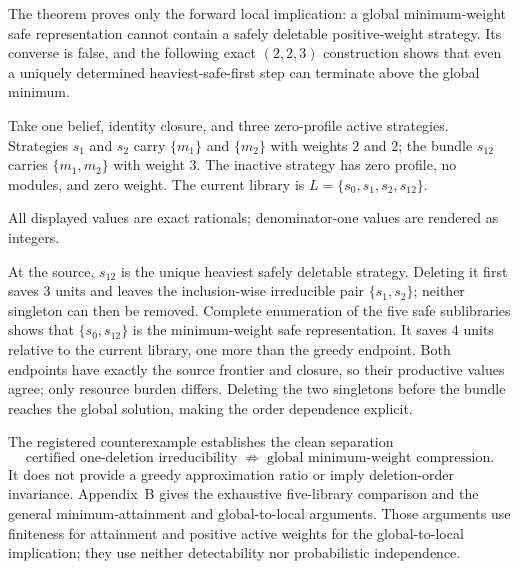 The theorem proves only the forward local implication: a global
minimum-weight safe representation cannot contain a safely deletable
positive-weight strategy.  Its converse is false, and the following exact
\((2,2,3)\) construction shows that even a uniquely determined
heaviest-safe-first step can terminate above the global minimum.

\begin{example}
\label{ex:worked-safe-greedy-global}
Take one belief, identity closure, and three zero-profile active strategies.
Strategies \(s_1\) and \(s_2\) carry \(\{m_1\}\) and \(\{m_2\}\) with weights
\(2\) and \(2\); the bundle \(s_{12}\) carries
\(\{m_1,m_2\}\) with weight \(3\).  The inactive strategy has zero profile,
no modules, and zero weight.  The current library is
\(L=\{s_0,s_1,s_2,s_{12}\}\).

\begin{center}
\small

\end{center}

All displayed values are exact rationals; denominator-one values are rendered
as integers.

At the source, \(s_{12}\) is the unique heaviest safely deletable strategy.
Deleting it first saves \(3\) units and leaves the inclusion-wise irreducible
pair \(\{s_1,s_2\}\); neither singleton can then be removed.  Complete
enumeration of the five safe sublibraries shows that
\(\{s_0,s_{12}\}\) is the minimum-weight safe representation.  It saves
\(4\) units relative to the current library, one more than the greedy endpoint.
Both endpoints have exactly the source frontier and closure, so their
productive values agree; only resource burden differs.  Deleting the two
singletons before the bundle reaches the global solution, making the order
dependence explicit.
\end{example}

The registered counterexample establishes the clean separation
\[
 \text{certified one-deletion irreducibility}
 \;\not\Longrightarrow\;
 \text{global minimum-weight compression}.
\]
It does not provide a greedy approximation ratio or imply deletion-order
invariance.  Appendix~B gives the exhaustive five-library comparison and the
general minimum-attainment and global-to-local arguments.  Those arguments
use finiteness for attainment and positive active weights for the
global-to-local implication; they use neither detectability nor probabilistic
independence.
